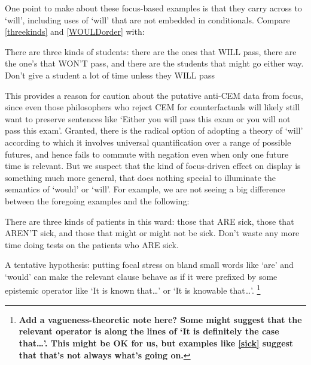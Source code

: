 \documentclass[If.tex]{subfiles}
\begin{document}
One point to make about these focus-based examples is that they carry across to ‘will’, including uses of ‘will’ that are not embedded in conditionals. Compare \ref{threekinds} and \ref{WOULDorder} with:
\begin{prop}
	\nitem
	There are three kinds of students: there are the ones that WILL pass, there are the one's that WON'T pass, and there are the students that might go either way.
	\nitem
	Don't give a student a lot of time unless they WILL pass
\end{prop}
This provides a reason for caution about the putative anti-CEM data from focus, since even those philosophers who reject CEM for counterfactuals will likely still want to preserve sentences like ‘Either you will pass this exam or you will not pass this exam’. Granted, there is the radical option of adopting a theory of ‘will’ according to which it involves universal quantification over a range of possible futures, and hence fails to commute with negation even when only one future time is relevant. But we suspect that the kind of focus-driven effect on display is something much more general, that does nothing special to illuminate the semantics of ‘would’ or ‘will’. For example, we are not seeing a big difference between the foregoing examples and the following:
\begin{prop}
	\nitem \label{sick}
	There are three kinds of patients in this ward: those that ARE sick, those that AREN'T sick, and those that might or might not be sick.
	\nitem
	Don't waste any more time doing tests on the patients who ARE sick.
\end{prop}
A tentative hypothesis: putting focal stress on bland small words like ‘are’ and ‘would’ can make the relevant clause behave as if it were prefixed by some epistemic operator like ‘It is known that\ldots{}’ or ‘It is knowable that\ldots{}’.%
\footnote{\textbf{Add a vagueness-theoretic note here? Some might suggest that the relevant operator is along the lines of ‘It is definitely the case that\ldots{}’. This might be OK for us, but examples like \ref{sick} suggest that that's not always what's going on.}}
\end{document}
